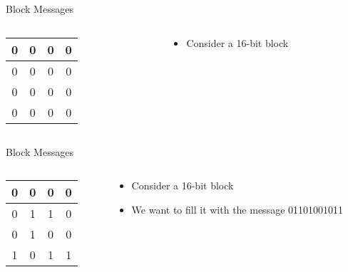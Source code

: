 \documentclass[aspectratio=169, handout]{beamer}
\makeatletter
\newcommand{\blu}[1]{{\color{sigma@mainblue}#1}}
\makeatother
\begin{document}
\begin{frame}{Block Messages}
    \begin{columns}[c]
    \begin{column}{5cm}
    \begin{table}
        \centering
        \begin{tabular}{|c|c|c|c|}
            \hline 
            0 & 0 & 0 & 0 \\ \hline
            0 & 0 & 0 & 0 \\ \hline
            0 & 0 & 0 & 0 \\ \hline
            0 & 0 & 0 & 0 \\ \hline
        \end{tabular}
    \end{table}
    \end{column}
    \hfill
    \begin{column}{5cm}
        \begin{itemize}
            \item Consider a 16-bit block
        \end{itemize}
    \end{column}
    \end{columns}
\end{frame}

\begin{frame}{Block Messages}
    \begin{columns}[c]
    \begin{column}{5cm}
    \begin{table}
        \centering
        \begin{tabular}{|c|c|c|c|}
            \hline 
            0 & 0 & 0 & \blu{0} \\ \hline
            0 & \blu{1} & \blu{1} & \blu{0} \\ \hline
            0 & \blu{1} & \blu{0} & \blu{0} \\ \hline
            \blu{1} & \blu{0} & \blu{1} & \blu{1} \\ \hline
        \end{tabular}
    \end{table}
    \end{column}
    \hfill
    \begin{column}{5cm}
        \begin{itemize}
            \item Consider a 16-bit block
            \item We want to fill it with the message 01101001011
        \end{itemize}
    \end{column}
    \end{columns}
\end{frame}
\end{document}
